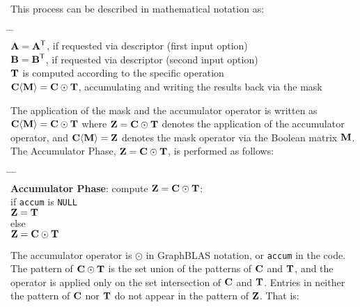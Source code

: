 \documentclass[12pt]{article}
\begin{document}
\noindent
This process can be described in mathematical notation as:
    \vspace{-0.2in}
    {\small
    \begin{tabbing}
    \hspace{2em} \= \hspace{2em} \= \hspace{2em} \= \\
    \> ${\bf A = A}^{\sf T}$, if requested via descriptor (first input option) \\
    \> ${\bf B = B}^{\sf T}$, if requested via descriptor (second input option) \\
    \> ${\bf T}$ is computed according to the specific operation  \\
    \> ${\bf C \langle M \rangle = C \odot T}$,
        accumulating and writing the results back via the mask
    \end{tabbing} }
\noindent
The application of the mask and the accumulator operator is written as
${\bf C \langle M \rangle = C \odot T}$ where ${\bf Z = C \odot T}$ denotes the
application of the accumulator operator, and
${\bf C \langle M \rangle = Z}$
denotes the mask operator via the Boolean matrix ${\bf M}$.  The Accumulator
Phase, ${\bf Z = C \odot T}$, is performed as follows:
    \vspace{-0.2in}
    {\small
    \begin{tabbing}
    \hspace{2em} \= \hspace{2em} \= \hspace{2em} \= \hspace{2em} \= \\
    \> {\bf Accumulator Phase}: compute ${\bf Z = C \odot T}$: \\
    \> \> if \verb'accum' is \verb'NULL' \\
    \> \>\>    ${\bf Z = T}$ \\
    \> \> else \\
    \> \>\>    ${\bf Z = C \odot T}$
    \end{tabbing}}
The accumulator operator is $\odot$ in GraphBLAS notation, or \verb'accum'
in the code.  The pattern of ${\bf C \odot T}$ is the set union of the
patterns of ${\bf C}$ and ${\bf T}$, and the operator is applied only on the
set intersection of ${\bf C}$ and ${\bf T}$.  Entries in neither the pattern
of ${\bf C}$ nor ${\bf T}$ do not appear in the pattern of ${\bf Z}$.  That is:
    \newpage %
\end{document}

